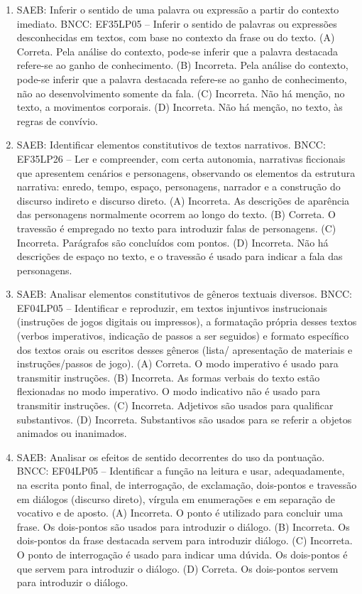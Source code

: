 \begin{enumerate}
\item
SAEB: Inferir o sentido de uma palavra ou expressão a partir do contexto imediato. BNCC: EF35LP05 -- Inferir o sentido de palavras ou expressões desconhecidas em textos, com base no contexto da frase ou do texto. 
(A) Correta. Pela análise do contexto, pode-se inferir que a palavra destacada refere-se ao ganho de conhecimento. 
(B) Incorreta. Pela análise do contexto, pode-se inferir que a palavra destacada refere-se ao ganho de conhecimento, não ao desenvolvimento somente da fala. 
(C) Incorreta. Não há menção, no texto, a movimentos corporais. 
(D) Incorreta. Não há menção, no texto, às regras de convívio.

\item
SAEB: Identificar elementos constitutivos de textos narrativos. BNCC: EF35LP26 -- Ler e compreender, com certa autonomia, narrativas ficcionais que apresentem cenários e personagens, observando os elementos da estrutura narrativa: enredo, tempo, espaço, personagens, narrador e a construção do discurso indireto e discurso direto. 
(A) Incorreta. As descrições de aparência das personagens normalmente ocorrem ao longo do texto. 
(B) Correta. O travessão é empregado no texto para introduzir falas de personagens. 
(C) Incorreta. Parágrafos são concluídos com pontos. 
(D) Incorreta. Não há descrições de espaço no texto, e o travessão é usado para indicar a fala das personagens.

\item
SAEB: Analisar elementos constitutivos de gêneros textuais diversos. BNCC: EF04LP05 -- Identificar e reproduzir, em textos injuntivos instrucionais (instruções de jogos digitais ou impressos), a formatação própria desses textos (verbos imperativos, indicação de passos a ser seguidos) e formato específico dos textos orais ou escritos desses gêneros (lista/ apresentação de materiais e instruções/passos de jogo). 
(A) Correta. O modo imperativo é usado para transmitir instruções. 
(B) Incorreta. As formas verbais do texto estão flexionadas no modo imperativo. O modo indicativo não é usado para transmitir instruções. 
(C) Incorreta. Adjetivos são usados para qualificar substantivos. 
(D) Incorreta. Substantivos são usados para se referir a objetos animados ou inanimados.

\item
SAEB: Analisar os efeitos de sentido decorrentes do uso da pontuação. BNCC: EF04LP05 -- Identificar a função na leitura e usar, adequadamente, na escrita ponto final, de interrogação, de exclamação, dois-pontos e travessão em diálogos (discurso direto), vírgula em enumerações e em separação de vocativo e de aposto. 
(A) Incorreta. O ponto é utilizado para concluir uma frase. Os dois-pontos são usados para introduzir o diálogo. 
(B) Incorreta. Os dois-pontos da frase destacada servem para introduzir diálogo. 
(C) Incorreta. O ponto de interrogação é usado para indicar uma dúvida. Os dois-pontos é que servem para introduzir o diálogo. 
(D) Correta. Os dois-pontos servem para introduzir o diálogo.


\end{enumerate}
